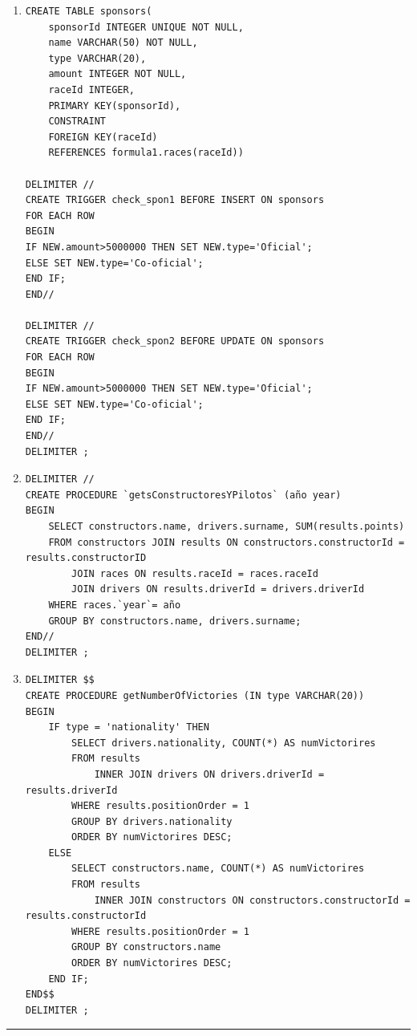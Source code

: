 \documentclass[a4paper]{article}
\begin{document}
\begin{enumerate}
\begin{verbatim}
    SELECT SUM(points) INTO points1
    FROM results
    WHERE driverId = driver1;
    
    SELECT SUM(points) INTO points2
    FROM results
    WHERE driverId = driver2;
          
    RETURN (points1 - points2);
END$$
DELIMITER ;    
    \end{verbatim}
    
    \item 
    \begin{verbatim}
CREATE TABLE sponsors(
    sponsorId INTEGER UNIQUE NOT NULL,
    name VARCHAR(50) NOT NULL,
    type VARCHAR(20),
    amount INTEGER NOT NULL,
    raceId INTEGER,
    PRIMARY KEY(sponsorId),
    CONSTRAINT
    FOREIGN KEY(raceId)
    REFERENCES formula1.races(raceId))

DELIMITER //
CREATE TRIGGER check_spon1 BEFORE INSERT ON sponsors
FOR EACH ROW
BEGIN
IF NEW.amount>5000000 THEN SET NEW.type='Oficial';
ELSE SET NEW.type='Co-oficial';
END IF;
END//

DELIMITER //
CREATE TRIGGER check_spon2 BEFORE UPDATE ON sponsors
FOR EACH ROW
BEGIN
IF NEW.amount>5000000 THEN SET NEW.type='Oficial';
ELSE SET NEW.type='Co-oficial';
END IF;
END//
DELIMITER ;    
    \end{verbatim}
    
    \item 
    \begin{verbatim}
DELIMITER //
CREATE PROCEDURE `getsConstructoresYPilotos` (año year)
BEGIN
    SELECT constructors.name, drivers.surname, SUM(results.points)
    FROM constructors JOIN results ON constructors.constructorId = results.constructorID
		JOIN races ON results.raceId = races.raceId
        JOIN drivers ON results.driverId = drivers.driverId
	WHERE races.`year`= año
    GROUP BY constructors.name, drivers.surname;
END//  
DELIMITER ;
    \end{verbatim}
    
    \item 
    \begin{verbatim}
DELIMITER $$
CREATE PROCEDURE getNumberOfVictories (IN type VARCHAR(20)) 
BEGIN
    IF type = 'nationality' THEN
        SELECT drivers.nationality, COUNT(*) AS numVictorires
        FROM results
            INNER JOIN drivers ON drivers.driverId = results.driverId
        WHERE results.positionOrder = 1
        GROUP BY drivers.nationality
        ORDER BY numVictorires DESC;
    ELSE 
        SELECT constructors.name, COUNT(*) AS numVictorires
        FROM results
            INNER JOIN constructors ON constructors.constructorId = results.constructorId
        WHERE results.positionOrder = 1
        GROUP BY constructors.name
        ORDER BY numVictorires DESC;
    END IF;
END$$
DELIMITER ;   
    \end{verbatim}
\end{enumerate}

\vspace{2em}
\hrule
\doclicenseThis
\end{document}
